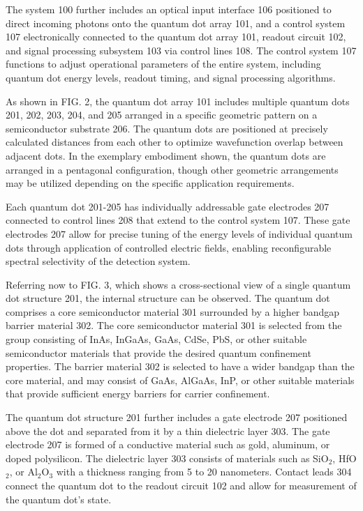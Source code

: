 \documentclass[12pt,letterpaper]{article}
\begin{document}
The system 100 further includes an optical input interface 106 positioned to direct incoming photons onto the quantum dot array 101, and a control system 107 electronically connected to the quantum dot array 101, readout circuit 102, and signal processing subsystem 103 via control lines 108. The control system 107 functions to adjust operational parameters of the entire system, including quantum dot energy levels, readout timing, and signal processing algorithms.

As shown in FIG. 2, the quantum dot array 101 includes multiple quantum dots 201, 202, 203, 204, and 205 arranged in a specific geometric pattern on a semiconductor substrate 206. The quantum dots are positioned at precisely calculated distances from each other to optimize wavefunction overlap between adjacent dots. In the exemplary embodiment shown, the quantum dots are arranged in a pentagonal configuration, though other geometric arrangements may be utilized depending on the specific application requirements.

Each quantum dot 201-205 has individually addressable gate electrodes 207 connected to control lines 208 that extend to the control system 107. These gate electrodes 207 allow for precise tuning of the energy levels of individual quantum dots through application of controlled electric fields, enabling reconfigurable spectral selectivity of the detection system.

Referring now to FIG. 3, which shows a cross-sectional view of a single quantum dot structure 201, the internal structure can be observed. The quantum dot comprises a core semiconductor material 301 surrounded by a higher bandgap barrier material 302. The core semiconductor material 301 is selected from the group consisting of InAs, InGaAs, GaAs, CdSe, PbS, or other suitable semiconductor materials that provide the desired quantum confinement properties. The barrier material 302 is selected to have a wider bandgap than the core material, and may consist of GaAs, AlGaAs, InP, or other suitable materials that provide sufficient energy barriers for carrier confinement.

The quantum dot structure 201 further includes a gate electrode 207 positioned above the dot and separated from it by a thin dielectric layer 303. The gate electrode 207 is formed of a conductive material such as gold, aluminum, or doped polysilicon. The dielectric layer 303 consists of materials such as SiO$_2$, HfO$_2$, or Al$_2$O$_3$ with a thickness ranging from 5 to 20 nanometers. Contact leads 304 connect the quantum dot to the readout circuit 102 and allow for measurement of the quantum dot's state.
\end{document}
